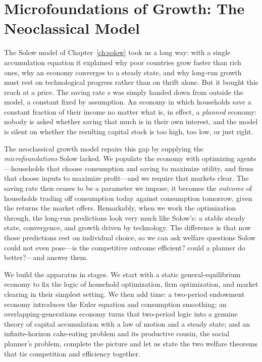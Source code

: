 \chapter{Microfoundations of Growth: The Neoclassical Model}
\label{ch:neoclassical}

The Solow model of Chapter~\ref{ch:solow} took us a long way: with a single accumulation equation it explained why poor countries grow faster than rich ones, why an economy converges to a steady state, and why long-run growth must rest on technological progress rather than on thrift alone. But it bought this reach at a price. The saving rate $s$ was simply handed down from outside the model, a constant fixed by assumption. An economy in which households save a constant fraction of their income no matter what is, in effect, a \emph{planned} economy: nobody is asked whether saving that much is in their own interest, and the model is silent on whether the resulting capital stock is too high, too low, or just right.

The neoclassical growth model repairs this gap by supplying the \emph{microfoundations} Solow lacked. We populate the economy with optimizing agents---households that choose consumption and saving to maximize utility, and firms that choose inputs to maximize profit---and we require that markets clear. The saving rate then ceases to be a parameter we impose; it becomes the \emph{outcome} of households trading off consumption today against consumption tomorrow, given the returns the market offers. Remarkably, when we work the optimization through, the long-run predictions look very much like Solow's: a stable steady state, convergence, and growth driven by technology. The difference is that now those predictions rest on individual choice, so we can ask welfare questions Solow could not even pose---is the competitive outcome efficient? could a planner do better?---and answer them.

We build the apparatus in stages. We start with a static general-equilibrium economy to fix the logic of household optimization, firm optimization, and market clearing in their simplest setting. We then add time: a two-period endowment economy introduces the Euler equation and consumption smoothing; an overlapping-generations economy turns that two-period logic into a genuine theory of capital accumulation with a law of motion and a steady state; and an infinite-horizon cake-eating problem and its productive cousin, the social planner's problem, complete the picture and let us state the two welfare theorems that tie competition and efficiency together.

